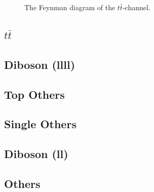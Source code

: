 \begin{figure}
    \centering
    \caption{The Feynman diagram of the $t\bar{t}$-channel.}
\end{figure}

\subsection{$t\bar{t}$}
\subsection{Diboson (llll)}
\subsection{Top Others}
\subsection{Single Others}
\subsection{Diboson (ll)}
\subsection{Others}

